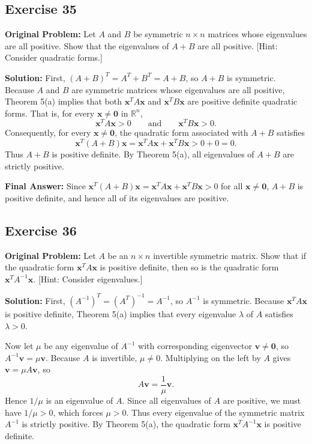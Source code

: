 \documentclass[11pt, letterpaper]{article}
\theoremstyle{definition}
\theoremstyle{remark}
\begin{document}
\hrulefill

\subsection*{Exercise 35}
\textbf{Original Problem:} Let $A$ and $B$ be symmetric $n \times n$ matrices whose eigenvalues are all positive. Show that the eigenvalues of $A + B$ are all positive. [Hint: Consider quadratic forms.]

\textbf{Solution:}
First, $(A + B)^T = A^T + B^T = A + B$, so $A + B$ is symmetric. Because $A$ and $B$ are symmetric matrices whose eigenvalues are all positive, Theorem 5(a) implies that both $\mathbf{x}^T A \mathbf{x}$ and $\mathbf{x}^T B \mathbf{x}$ are positive definite quadratic forms. That is, for every $\mathbf{x} \ne \mathbf{0}$ in $\mathbb{R}^n$,
\[
\mathbf{x}^T A \mathbf{x} > 0 \qquad \text{and} \qquad \mathbf{x}^T B \mathbf{x} > 0.
\]
Consequently, for every $\mathbf{x} \ne \mathbf{0}$, the quadratic form associated with $A + B$ satisfies
\[
\mathbf{x}^T (A + B) \mathbf{x} = \mathbf{x}^T A \mathbf{x} + \mathbf{x}^T B \mathbf{x} > 0 + 0 = 0.
\]
Thus $A + B$ is positive definite. By Theorem 5(a), all eigenvalues of $A + B$ are strictly positive.

\textbf{Final Answer:} Since $\mathbf{x}^T (A+B)\mathbf{x} = \mathbf{x}^T A\mathbf{x} + \mathbf{x}^T B\mathbf{x} > 0$ for all $\mathbf{x} \ne \mathbf{0}$, $A+B$ is positive definite, and hence all of its eigenvalues are positive.

\hrulefill

\subsection*{Exercise 36}
\textbf{Original Problem:} Let $A$ be an $n \times n$ invertible symmetric matrix. Show that if the quadratic form $\mathbf{x}^T A \mathbf{x}$ is positive definite, then so is the quadratic form $\mathbf{x}^T A^{-1} \mathbf{x}$. [Hint: Consider eigenvalues.]

\textbf{Solution:}
First, $(A^{-1})^T = (A^T)^{-1} = A^{-1}$, so $A^{-1}$ is symmetric. Because $\mathbf{x}^T A \mathbf{x}$ is positive definite, Theorem 5(a) implies that every eigenvalue $\lambda$ of $A$ satisfies $\lambda > 0$.

Now let $\mu$ be any eigenvalue of $A^{-1}$ with corresponding eigenvector $\mathbf{v} \ne \mathbf{0}$, so $A^{-1} \mathbf{v} = \mu \mathbf{v}$. Because $A$ is invertible, $\mu \ne 0$. Multiplying on the left by $A$ gives $\mathbf{v} = \mu A\mathbf{v}$, so
\[
A\mathbf{v} = \frac{1}{\mu}\mathbf{v}.
\]
Hence $1/\mu$ is an eigenvalue of $A$. Since all eigenvalues of $A$ are positive, we must have $1/\mu > 0$, which forces $\mu > 0$. Thus every eigenvalue of the symmetric matrix $A^{-1}$ is strictly positive. By Theorem 5(a), the quadratic form $\mathbf{x}^T A^{-1} \mathbf{x}$ is positive definite.
\end{document}
